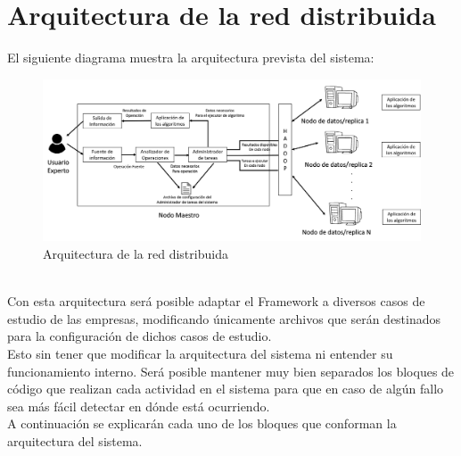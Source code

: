 \section{Arquitectura de la red distribuida}
El siguiente diagrama muestra la arquitectura prevista del sistema:
\begin{figure}[!htbp]
	\hypertarget{fig:cap1}{\hspace{1pt}}
	\begin{center}
		\includegraphics[height=0.3\textheight]{capitulo1/images/im1.png}
		\caption{Arquitectura de la red distribuida}
		\label{fig:cap1}
	\end{center}
\end{figure}
\\ 
Con esta arquitectura será posible adaptar el Framework a diversos casos de estudio de las empresas, modificando únicamente archivos que serán destinados para la configuración de dichos
casos de estudio. 
\\
Esto sin tener que modificar la arquitectura del sistema ni entender su funcionamiento interno. Será posible
mantener muy bien separados los bloques de código que realizan cada actividad en el sistema para que en caso de algún fallo sea
más fácil detectar en dónde está ocurriendo.
\\
A continuación se explicarán cada uno de los bloques que conforman la arquitectura del sistema.
